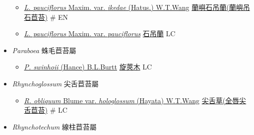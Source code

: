 \begin{itemize}
  \begin{itemize}
        \item[] \href{http://www.theplantlist.org/tpl1.1/search?q=Lysionotus+pauciflorus+var.+ikedae}{\textit{L. pauciflorus} Maxim. var. \textit{ikedae} (Hatus.) W.T.Wang}   \href{\detokenize{http://taibnet.sinica.edu.tw/chi/taibnet_species_list.php?T2=蘭嶼石吊蘭&T2_new_value=true&fr=y}}{蘭嶼石吊蘭(蘭嶼吊石苣苔)}  \# EN
        \item[] \href{http://www.theplantlist.org/tpl1.1/search?q=Lysionotus+pauciflorus+var.+pauciflorus}{\textit{L. pauciflorus} Maxim. var. \textit{pauciflorus}}   \href{\detokenize{http://taibnet.sinica.edu.tw/chi/taibnet_species_list.php?T2=石吊蘭&T2_new_value=true&fr=y}}{石吊蘭} LC
  \end{itemize}
 \item[] \textit{Paraboea} 蛛毛苣苔屬
                    
  \begin{itemize}
        \item[] \href{http://www.theplantlist.org/tpl1.1/search?q=Paraboea+swinhoii}{\textit{P. swinhoii} (Hance) B.L.Burtt}   \href{\detokenize{http://taibnet.sinica.edu.tw/chi/taibnet_species_list.php?T2=旋莢木&T2_new_value=true&fr=y}}{旋莢木} LC
  \end{itemize}
 \item[] \textit{Rhynchoglossum} 尖舌苣苔屬
                    
  \begin{itemize}
        \item[] \href{http://www.theplantlist.org/tpl1.1/search?q=Rhynchoglossum+obliquum+var.+hologlossum}{\textit{R. obliquum} Blume var. \textit{hologlossum} (Hayata) W.T.Wang}   \href{\detokenize{http://taibnet.sinica.edu.tw/chi/taibnet_species_list.php?T2=尖舌草&T2_new_value=true&fr=y}}{尖舌草(全唇尖舌苣苔)}  \# LC
  \end{itemize}
 \item[] \textit{Rhynchotechum} 線柱苣苔屬
                    

\end{itemize}

